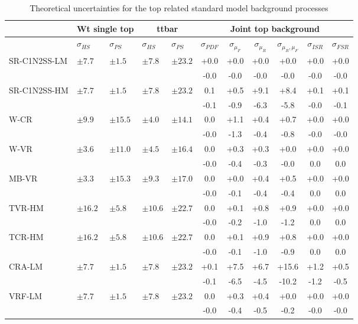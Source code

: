 \begin{table}[h]
\centering %
\begin{tabular}{|l|l|l|l|l|c|c|c|c|c|c|}
\hline 
 & \multicolumn{2}{c|}{Wt single top} & \multicolumn{2}{c|}{ttbar} & \multicolumn{6}{c|}{Joint top background}\tabularnewline
\hline 
 & $\sigma_{HS}$ & $\sigma_{PS}$ & $\sigma_{HS}$ & $\sigma_{PS}$ & $\sigma_{PDF}$ & $\sigma_{\mu_{F}}$ & $\sigma_{\mu_{R}}$ & $\sigma_{\mu_{R},\mu_{F}}$ & $\sigma_{ISR}$ & $\sigma_{FSR}$\tabularnewline
\hline 
\multirow{2}{*}{SR-C1N2SS-LM} & \multirow{2}{*}{$\pm7.7$} & \multirow{2}{*}{$\pm1.5$} & \multirow{2}{*}{$\pm7.8$} & \multirow{2}{*}{$\pm23.2$} & +0.0  & +0.0  & +0.0  & +0.0  & +0.0  & +0.0 \tabularnewline
 &  &  &  &  & -0.0  & -0.0  & -0.0  & -0.0  & -0.0  & -0.0\tabularnewline
\hline 
\multirow{2}{*}{SR-C1N2SS-HM} & \multirow{2}{*}{$\pm7.7$} & \multirow{2}{*}{$\pm1.5$} & \multirow{2}{*}{$\pm7.8$} & \multirow{2}{*}{$\pm23.2$} & 0.1  & +0.5  & +9.1  & +8.4  & +0.1  & +0.1 \tabularnewline
 &  &  &  &  & -0.1  & -0.9  & -6.3  & -5.8  & -0.0  & -0.1\tabularnewline
\hline 
\multirow{2}{*}{W-CR} & \multirow{2}{*}{$\pm9.9$} & \multirow{2}{*}{$\pm15.5$} & \multirow{2}{*}{$\pm4.0$} & \multirow{2}{*}{$\pm14.1$} & 0.0  & +1.1  & +0.4  & +0.7  & +0.0  & +0.0 \tabularnewline
 &  &  &  &  & -0.0  & -1.3  & -0.4  & -0.8  & -0.0  & -0.0\tabularnewline
\hline 
\multirow{2}{*}{W-VR} & \multirow{2}{*}{$\pm3.6$} & \multirow{2}{*}{$\pm11.0$} & \multirow{2}{*}{$\pm4.5$} & \multirow{2}{*}{$\pm16.4$} & 0.0  & +0.3  & +0.3  & +0.0  & +0.0  & +0.0 \tabularnewline
 &  &  &  &  & -0.0  & -0.4  & -0.3  & -0.0  & 0.0  & 0.0\tabularnewline
\hline 
\multirow{2}{*}{MB-VR} & \multirow{2}{*}{$\pm3.3$} & \multirow{2}{*}{$\pm15.3$} & \multirow{2}{*}{$\pm9.3$} & \multirow{2}{*}{$\pm17.0$} & 0.0  & +0.0  & +0.4  & +0.5  & +0.0  & +0.0 \tabularnewline
 &  &  &  &  & -0.0  & -0.1  & -0.4  & -0.4  & 0.0  & 0.0\tabularnewline
\hline 
\multirow{2}{*}{TVR-HM} & \multirow{2}{*}{$\pm16.2$} & \multirow{2}{*}{$\pm5.8$} & \multirow{2}{*}{$\pm10.6$} & \multirow{2}{*}{$\pm22.7$} & 0.0  & +0.1  & +0.8  & +0.9  & +0.0  & +0.0 \tabularnewline
 &  &  &  &  & -0.0  & -0.2  & -1.0  & -1.2  & 0.0  & 0.0\tabularnewline
\hline 
\multirow{2}{*}{TCR-HM} & \multirow{2}{*}{$\pm16.2$} & \multirow{2}{*}{$\pm5.8$} & \multirow{2}{*}{$\pm10.6$} & \multirow{2}{*}{$\pm22.7$} & 0.0  & +0.1  & +0.9  & +0.8  & +0.0  & +0.0 \tabularnewline
 &  &  &  &  & -0.0  & -0.1  & -1.0  & -0.9  & 0.0  & 0.0\tabularnewline
\hline 
\multirow{2}{*}{CRA-LM} & \multirow{2}{*}{$\pm7.7$} & \multirow{2}{*}{$\pm1.5$} & \multirow{2}{*}{$\pm7.8$} & \multirow{2}{*}{$\pm23.2$} & +0.1  & +7.5  & +6.7  & +15.6  & +1.2  & +0.5 \tabularnewline
 &  &  &  &  & -0.1  & -6.5  & -4.5  & -10.2  & -1.2  & -0.5\tabularnewline
\hline 
\multirow{2}{*}{VRF-LM} & \multirow{2}{*}{$\pm7.7$} & \multirow{2}{*}{$\pm1.5$} & \multirow{2}{*}{$\pm7.8$} & \multirow{2}{*}{$\pm23.2$} & 0.0  & +0.3  & +0.4  & +0.0  & +0.0  & +0.0 \tabularnewline
 &  &  &  &  & -0.0  & -0.4  & -0.5  & -0.2  & -0.0  & -0.0\tabularnewline
\hline 
\end{tabular}\caption{Theoretical uncertainties for the top related standard model background
processes}
\end{table}
\FloatBarrier
